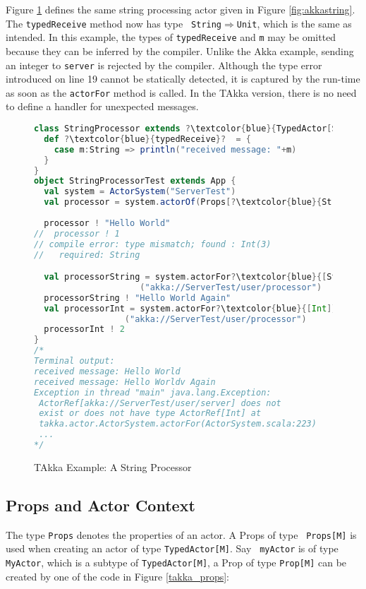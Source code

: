 Figure \ref{takkastring} defines the same string processing actor given in
Figure \ref{fig:akkastring}.  The {\tt typedReceive} method now has type 
{\tt 
String$\Rightarrow$Unit}, which is the same as intended.  In this example, the 
types of {\tt typedReceive} and {\tt m} may be omitted because they 
can be inferred by the compiler.  Unlike the Akka example, sending an integer 
to {\tt server} is rejected by the compiler.  Although the type error 
introduced on line 19 cannot be statically detected, it is captured by the 
run-time as soon as the {\tt actorFor} method is called.  In the TAkka version, 
there is no need to define a handler for unexpected messages.

\begin{figure}[!h]
      \begin{lstlisting}[language=scala, escapechar=?]
class StringProcessor extends ?\textcolor{blue}{TypedActor[String]}?  {
  def ?\textcolor{blue}{typedReceive}?  = {
    case m:String => println("received message: "+m)
  }
}
object StringProcessorTest extends App {
  val system = ActorSystem("ServerTest")
  val processor = system.actorOf(Props[?\textcolor{blue}{String}?, StringProcessor], "processor")
  
  processor ! "Hello World"
//  processor ! 1
// compile error: type mismatch; found : Int(3)
//   required: String

  val processorString = system.actorFor?\textcolor{blue}{[String]}?
                     ("akka://ServerTest/user/processor")
  processorString ! "Hello World Again"
  val processorInt = system.actorFor?\textcolor{blue}{[Int]}?
                  ("akka://ServerTest/user/processor")
  processorInt ! 2
}
/*
Terminal output:
received message: Hello World
received message: Hello Worldv Again
Exception in thread "main" java.lang.Exception: 
 ActorRef[akka://ServerTest/user/server] does not 
 exist or does not have type ActorRef[Int] at 
 takka.actor.ActorSystem.actorFor(ActorSystem.scala:223)
 ...
*/
    \end{lstlisting}
    \caption{TAkka Example: A String Processor}
    \label{takkastring}
\end{figure}

\subsection{Props and Actor Context}
\label{actor_context}
The type {\tt Props} denotes the properties of an actor.   A Props of type {\tt 
Props[M]} is used when creating an actor of type {\tt TypedActor[M]}.  Say {\tt 
myActor} is of type {\tt MyActor}, which is a subtype of {\tt TypedActor[M]}, a 
Prop of type {\tt Prop[M]} can be created by one of the code in Figure 
\ref{takka_props}:

